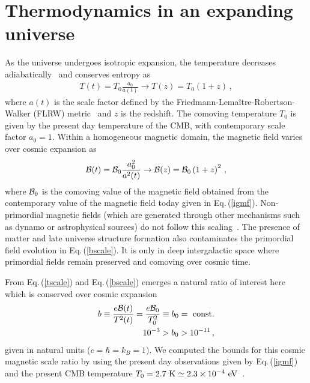 \documentclass[reprint]{revtex4-2}
\newcommand*{\eV}{\text{ eV}}
\newcommand{\req}[1]{Eq.\,(\ref{#1})}
\begin{document}
\section{Thermodynamics in an expanding universe}
\label{sec:expansion}
\noindent
As the universe undergoes isotropic expansion, the temperature decreases adiabatically~\cite{abdalla2022cosmology} and conserves entropy as 
\begin{align}
    \label{tscale}
    T(t)=T_{0}\frac{a_{0}}{a(t)}\rightarrow T(z)=T_{0}(1+z)\,,
\end{align}
where $a(t)$ is the scale factor defined by the Friedmann-Lema{\^i}tre-Robertson-Walker (FLRW) metric~\cite{weinberg1972gravitation} and $z$ is the redshift. The comoving temperature $T_{0}$ is given by the present day temperature of the CMB, with contemporary scale factor $a_{0}=1$. Within a homogeneous magnetic domain, the magnetic field varies~\cite{durrer2013cosmological} over cosmic expansion as
\begin{align}
    \label{bscale}
    {\cal B}(t)={\cal B}_{0}\frac{a_{0}^{2}}{a^{2}(t)}\rightarrow{\cal B}(z)={\cal B}_{0}\left(1+z\right)^{2}\,,
\end{align}
where ${\cal B}_{0}$ is the comoving value of the magnetic field obtained from the contemporary value of the magnetic field today  given in \req{igmf}. Non-primordial magnetic fields (which are generated through other mechanisms  such as dynamo or astrophysical sources) do not follow this scaling~\cite{pomakov2022redshift}. The presence of matter and late universe structure formation also  contaminates the primordial field evolution in \req{bscale}. It is only in deep intergalactic space where primordial fields remain preserved and comoving over cosmic time.

From \req{tscale} and \req{bscale} emerges a natural ratio of interest here which is conserved over cosmic expansion 
\begin{align}
    \label{tbscale}
    b \equiv\frac{e{\cal B}(t)}{T^{2}(t)}=\frac{e{\cal B}_{0}}{T_{0}^{2}}\equiv b_0={\rm\ const.}\\
    10^{-3}>b_{0}>10^{-11}\,,
\end{align}
given in natural units ($c=\hbar=k_{B}=1$). We computed the bounds for this cosmic magnetic scale ratio by using the present day observations given by \req{igmf} and the present CMB temperature $T_{0}=2.7{\rm\ K}\simeq2.3\times10^{-4}\eV$~\cite{aghanim2018planck}.
\end{document}
